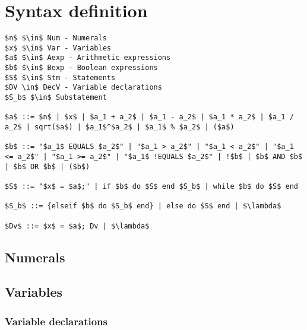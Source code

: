 \section{Syntax definition}\label{sec:anlysis:syntax-definition}
\begin{lstlisting}[mathescape, captionpos=b, caption={Syntax formation rules}, label={lst:syntax-formation}]
$n$ $\in$ Num - Numerals
$x$ $\in$ Var - Variables
$a$ $\in$ Aexp - Arithmetic expressions
$b$ $\in$ Bexp - Boolean expressions
$S$ $\in$ Stm - Statements
$DV \in$ DecV - Variable declarations
$S_b$ $\in$ Substatement

$a$ ::= $n$ | $x$ | $a_1 + a_2$ | $a_1 - a_2$ | $a_1 * a_2$ | $a_1 / a_2$ | sqrt($a$) | $a_1$^$a_2$ | $a_1$ % $a_2$ | ($a$)

$b$ ::= "$a_1$ EQUALS $a_2$" | "$a_1 > a_2$" | "$a_1 < a_2$" | "$a_1 <= a_2$" | "$a_1 >= a_2$" | "$a_1$ !EQUALS $a_2$" | !$b$ | $b$ AND $b$ | $b$ OR $b$ | ($b$)

$S$ ::= "$x$ = $a$;" | if $b$ do $S$ end $S_b$ | while $b$ do $S$ end

$S_b$ ::= {elseif $b$ do $S_b$ end} | else do $S$ end | $\lambda$

$Dv$ ::= $x$ = $a$; Dv | $\lambda$
\end{lstlisting}

\subsection{Numerals}

\subsection{Variables}

\subsubsection{Variable declarations}

